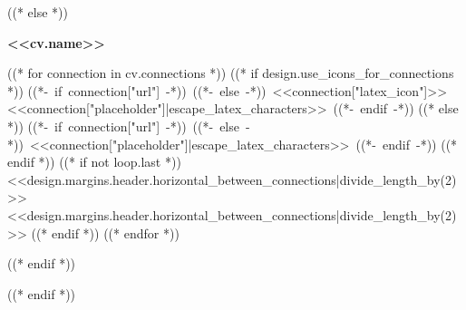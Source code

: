 ((* else *))
\begin{header}
    \fontsize{<<design.header_font_size>>}{<<design.header_font_size>>}
    \textbf{<<cv.name>>}

    \vspace{<<design.margins.header.vertical_between_name_and_connections>>}

    \normalsize
    ((* for connection in cv.connections *))
        ((* if design.use_icons_for_connections *))
    \mbox{((*- if connection["url"] -*))
        ((*- else -*))
        {\footnotesize<<connection["latex_icon"]>>}\hspace*{0.13cm}<<connection["placeholder"]|escape_latex_characters>>
        ((*- endif -*))}%
        ((* else *))
    \mbox{((*- if connection["url"] -*))
        ((*- else -*))
        <<connection["placeholder"]|escape_latex_characters>>
        ((*- endif -*))}%
        ((* endif *))
        ((* if not loop.last *))
    \kern <<design.margins.header.horizontal_between_connections|divide_length_by(2)>>%
    \AND%
    \kern <<design.margins.header.horizontal_between_connections|divide_length_by(2)>>%
        ((* endif *))
    ((* endfor *))
\end{header}
((* endif *))

\vspace{<<design.margins.header.bottom>> - <<design.margins.section_title.top>>}
((* endif *))